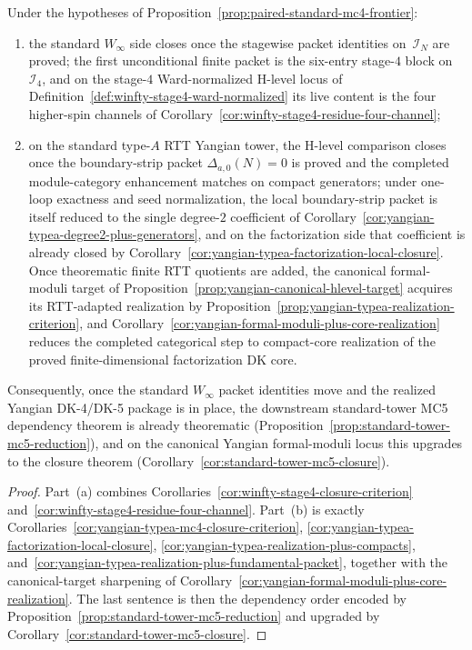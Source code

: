 \begin{corollary}
\label{cor:paired-standard-mc4-closure}
Under the hypotheses of
Proposition~\ref{prop:paired-standard-mc4-frontier}:
\begin{enumerate}[label=\textup{(\alph*)}]
\item the standard \texorpdfstring{$W_\infty$}{W_infty} side closes once
  the stagewise packet identities on~$\mathcal{I}_N$ are proved; the
  first unconditional finite packet is the six-entry stage-$4$ block
  on~$\mathcal{I}_4$, and on the stage-$4$ Ward-normalized H-level
  locus of Definition~\ref{def:winfty-stage4-ward-normalized} its live
  content is the four higher-spin channels of
  Corollary~\ref{cor:winfty-stage4-residue-four-channel};
\item on the standard type-$A$ RTT Yangian tower, the H-level
  comparison closes once the boundary-strip packet
  $\Delta_{a,0}(N)=0$ is proved and the completed module-category
  enhancement matches on compact generators; under one-loop exactness
  and seed normalization, the local boundary-strip packet is itself
  reduced to the single degree-$2$ coefficient of
  Corollary~\ref{cor:yangian-typea-degree2-plus-generators}, and on
  the factorization side that coefficient is already closed by
  Corollary~\ref{cor:yangian-typea-factorization-local-closure}.  Once
  theorematic finite RTT quotients are added, the canonical formal-moduli
  target of Proposition~\ref{prop:yangian-canonical-hlevel-target}
  acquires its RTT-adapted realization by
  Proposition~\ref{prop:yangian-typea-realization-criterion}, and
  Corollary~\ref{cor:yangian-formal-moduli-plus-core-realization}
  reduces the completed categorical step to compact-core realization of
  the proved finite-dimensional factorization DK core.
\end{enumerate}
Consequently, once the standard \texorpdfstring{$W_\infty$}{W_infty}
packet identities move and the realized Yangian DK-4/DK-5 package is
in place, the downstream standard-tower MC5 dependency theorem is
already theorematic
\textup{(}Proposition~\textup{\ref{prop:standard-tower-mc5-reduction}}\textup{)},
and on the canonical Yangian formal-moduli locus this upgrades to the
closure theorem
\textup{(}Corollary~\textup{\ref{cor:standard-tower-mc5-closure}}\textup{)}.
\end{corollary}

\begin{proof}
Part~\textup{(a)} combines
Corollaries~\ref{cor:winfty-stage4-closure-criterion}
and~\ref{cor:winfty-stage4-residue-four-channel}.  Part~\textup{(b)} is
exactly
Corollaries~\ref{cor:yangian-typea-mc4-closure-criterion},
\ref{cor:yangian-typea-factorization-local-closure},
\ref{cor:yangian-typea-realization-plus-compacts},
and~\ref{cor:yangian-typea-realization-plus-fundamental-packet},
together with the canonical-target sharpening of
Corollary~\ref{cor:yangian-formal-moduli-plus-core-realization}.  The last
sentence is then the dependency order encoded by
Proposition~\ref{prop:standard-tower-mc5-reduction} and upgraded by
Corollary~\ref{cor:standard-tower-mc5-closure}.
\end{proof}

